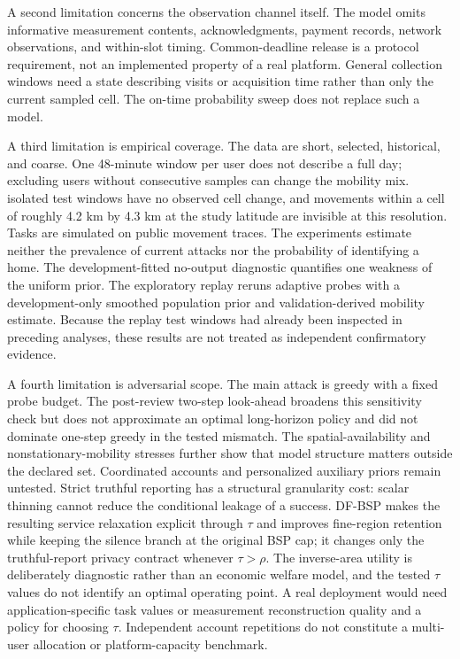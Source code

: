 \documentclass[10pt,journal,compsoc]{IEEEtran}
\begin{document}
A second limitation concerns the observation channel itself. The model omits informative measurement contents, acknowledgments, payment records, network observations, and within-slot timing. Common-deadline release is a protocol requirement, not an implemented property of a real platform. General collection windows need a state describing visits or acquisition time rather than only the current sampled cell. The on-time probability sweep does not replace such a model.

A third limitation is empirical coverage. The data are short, selected, historical, and coarse. One 48-minute window per user does not describe a full day; excluding users without consecutive samples can change the mobility mix. \ReplayStaticWindows{} isolated test windows have no observed cell change, and movements within a cell of roughly 4.2 km by 4.3 km at the study latitude are invisible at this resolution. Tasks are simulated on public movement traces. The experiments estimate neither the prevalence of current attacks nor the probability of identifying a home. The development-fitted no-output diagnostic quantifies one weakness of the uniform prior. The exploratory replay reruns adaptive probes with a development-only smoothed population prior and validation-derived mobility estimate. Because the replay test windows had already been inspected in preceding analyses, these results are not treated as independent confirmatory evidence.

A fourth limitation is adversarial scope. The main attack is greedy with a fixed probe budget. The post-review two-step look-ahead broadens this sensitivity check but does not approximate an optimal long-horizon policy and did not dominate one-step greedy in the tested mismatch. The spatial-availability and nonstationary-mobility stresses further show that model structure matters outside the declared set. Coordinated accounts and personalized auxiliary priors remain untested. Strict truthful reporting has a structural granularity cost: scalar thinning cannot reduce the conditional leakage of a success. DF-BSP makes the resulting service relaxation explicit through $\tau$ and improves fine-region retention while keeping the silence branch at the original BSP cap; it changes only the truthful-report privacy contract whenever $\tau>\rho$. The inverse-area utility is deliberately diagnostic rather than an economic welfare model, and the tested $\tau$ values do not identify an optimal operating point. A real deployment would need application-specific task values or measurement reconstruction quality and a policy for choosing $\tau$. Independent account repetitions do not constitute a multi-user allocation or platform-capacity benchmark.
\end{document}
